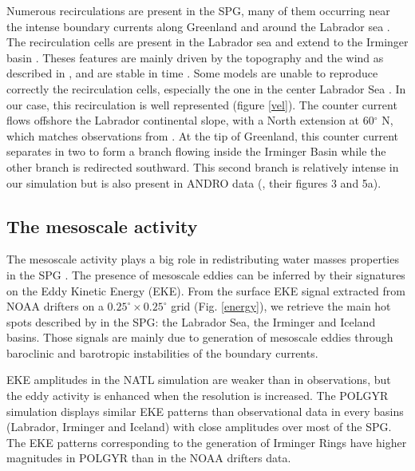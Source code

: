\documentclass{ametsoc}
\begin{document}
Numerous recirculations are present in the SPG, many of them occurring near the intense boundary currents along Greenland and around the Labrador sea \citep{reverdin2003, flatau2003,cuny2002}. The recirculation cells are present in the Labrador sea \citep{lavender2000,cuny2002} and extend to the Irminger basin \citep{Holliday2009}. Theses features are mainly driven by the topography and the wind as described in \citet{kase2001,spall2003}, and are stable in time \citep{palter2016}. Some models are unable to reproduce correctly the recirculation cells, especially the one in the center Labrador Sea \citep{treguier2005}. In our case, this recirculation is well represented (figure \ref{vel}). The counter current flows offshore the Labrador continental slope, with a North extension at 60$^{\circ}$ N, which matches observations from \citet{lavender2005}.  At the tip of Greenland, this counter current separates in two to form a branch flowing inside the Irminger Basin while the other branch is redirected southward. This second branch is relatively intense in our simulation but is also present in ANDRO data (\cite{fischer2018}, their figures 3 and 5a). %

\subsection{The mesoscale activity}

The mesoscale activity plays a big role in redistributing water masses properties in the SPG \citep{dejong2016,zhao2018b}. The presence of mesoscale eddies can be inferred by their signatures on the Eddy Kinetic Energy (EKE). From the surface EKE signal extracted from NOAA drifters on a $0.25^{\circ}\times 0.25^{\circ}$ grid (Fig. \ref{energy}), we retrieve the main hot spots described by \citet{flatau2003} in the SPG: the Labrador Sea, the Irminger and Iceland basins. Those signals are mainly due to generation of mesoscale eddies through baroclinic and barotropic instabilities of the boundary currents.

EKE amplitudes in the NATL simulation are weaker than in observations, but the eddy activity is enhanced when the resolution is increased. The POLGYR simulation displays similar EKE patterns than observational data in every basins (Labrador, Irminger and Iceland) with close amplitudes over most of the SPG. The EKE patterns corresponding to the generation of Irminger Rings have higher magnitudes in POLGYR than in the NOAA drifters data.
\end{document}
